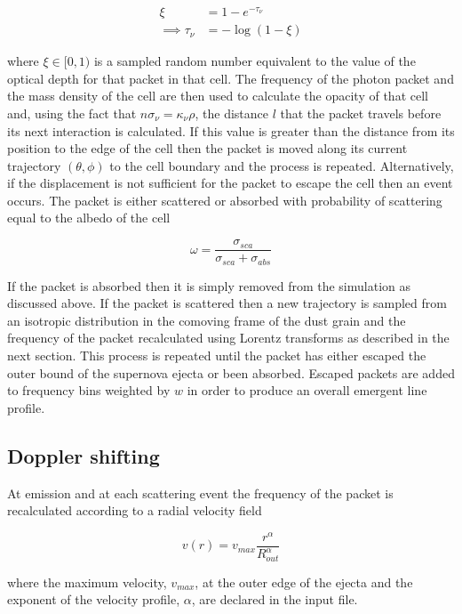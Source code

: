 \begin{align}
\xi &= 1 - e^{-\tau_{\nu}}  \\
\implies  \tau_{\nu}&=-\log (1-\xi) 
\end{align}

\noindent where $\xi \in [0,1)$ is a sampled random number equivalent to the value of the optical depth for that packet in that cell.  The frequency of the photon packet and the mass density of the cell are then used to calculate the opacity of that cell and, using the fact that $n\sigma_{\nu}=\kappa_{\nu}\rho$, the distance $l$ that the packet travels before its next interaction is calculated.  If this value is greater than the distance from its position to the edge of the cell then the packet is moved along its current trajectory $(\theta,\phi)$ to the cell boundary and the process is repeated.  Alternatively, if the displacement is not sufficient for the packet to escape the cell then an event occurs.  The packet is either scattered or absorbed with probability of scattering equal to the albedo of the cell

\begin{equation}
	\omega=\frac{\sigma_{sca}}{\sigma_{sca}+\sigma_{abs}}
\end{equation}

If the packet is absorbed then it is simply removed from the simulation as discussed above.  If the packet is scattered then a new trajectory is sampled from an isotropic distribution in the comoving frame of the dust grain and the frequency of the packet recalculated using Lorentz transforms as described in the next section.  This process is repeated until the packet has either escaped the outer bound of the supernova ejecta or been absorbed.  Escaped packets are added to frequency bins weighted by $w$ in order to produce an overall emergent line profile.


	\subsection{Doppler shifting}
	
At emission and at each scattering event the frequency of the packet is recalculated according to a radial velocity field 
	
\begin{equation} 
	v(r) = v_{max}\frac{r^{\alpha}}{R_{out}^{\alpha}}
\end{equation}

\noindent where the maximum velocity, $v_{max}$, at the outer edge of the ejecta and the exponent of the velocity profile, $\alpha$, are declared in the input file.	
		
